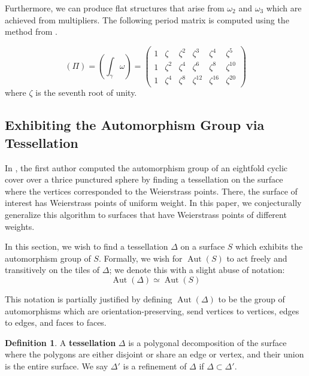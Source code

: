 \documentclass[12pt,reqno]{amsart}
\DeclareMathOperator{\Aut}{Aut}
\theoremstyle{definition}
\newtheorem{defn}{Definition}
\theoremstyle{remark}
\begin{document}
Furthermore, we can produce flat structures that arise from $\omega_2$ and $\omega_3$ which are achieved from multipliers. The following period matrix is computed using the method from \cite{kw}.

 $$(\Pi) = (\int_{\gamma} \omega) = \begin{pmatrix}
  1 & \zeta  & \zeta^2 & \zeta^3 & \zeta^4 & \zeta^5 \\
 1 & \zeta^2 & \zeta^4 & \zeta^6 & \zeta^8 & \zeta^{10} \\
 1 & \zeta^4 & \zeta^8 & \zeta^{12} & \zeta^{16} & \zeta^{20} 
 \end{pmatrix}$$ where $\zeta$ is the seventh root of unity.


\subsection{Exhibiting the Automorphism Group via Tessellation}

\label{sec:flagflag}

In \cite{dami}, the first author computed the automorphism group of an eightfold cyclic cover over a thrice punctured sphere by finding a tessellation on the surface where the vertices corresponded to the Weierstrass points. There, the surface of interest has Weierstrass points of uniform weight. In this paper, we conjecturally generalize this algorithm to surfaces that have Weierstrass points of different weights. %

In this section, we wish to find a tessellation $\Delta$ on a surface $S$ which exhibits the automorphism group of $S$. Formally, we wish for $\Aut(S)$ to act freely and transitively on the tiles of $\Delta$; we denote this with a slight abuse of notation:
\vspace{-3pt}
$$\Aut(\Delta) \simeq \Aut(S)$$

This notation is partially justified by defining $\Aut(\Delta)$ to be the group of automorphisms which are orientation-preserving, send vertices to vertices, edges to edges, and faces to faces. 

\begin{defn} A \textbf{tessellation} $\Delta$ is a polygonal decomposition of the surface where the polygons are either disjoint or share an edge or vertex, and their union is the entire surface. We say $\Delta'$ is a refinement of $\Delta$ if $\Delta \subset \Delta'$. \end{defn}
\end{document}
